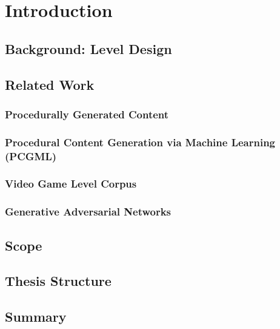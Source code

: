 \chapter{Introduction}

\section{Background: Level Design}
\section{Related Work}
\subsection{Procedurally Generated Content}
\subsection{Procedural Content Generation via Machine Learning (PCGML)}
\subsection{Video Game Level Corpus}

\subsection{Generative Adversarial Networks}

\section{Scope}
\section{Thesis Structure}
\section{Summary}